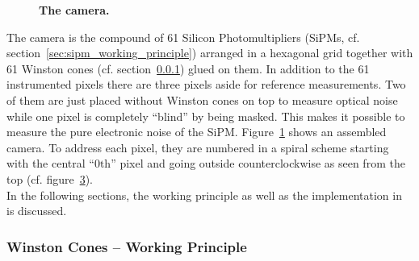\begin{figure}[H]
	\centering
	\begin{subfigure}[t]{0.49\textwidth}
		\label{iceact:camera:picture}	
	\end{subfigure}
	\hfill
	\begin{subfigure}[t]{0.49\textwidth}
		\usebox{\savedimage}
		\label{iceact:camera:pixelnumbering}	
	\end{subfigure}
	\caption[The \iceact camera]{\textbf{The \iceact camera.}}	
\end{figure}

The \iceact camera is the compound of 61 Silicon Photomultipliers (SiPMs, cf. section~\ref{sec:sipm_working_principle}) arranged in a hexagonal grid together with 61 Winston cones (cf. section~\ref{sec:winstoncones}) glued on them. In addition to the 61 instrumented pixels there are three pixels aside for reference measurements. Two of them are just placed without Winston cones on top to measure optical noise while one pixel is completely \enquote{blind} by being masked. This makes it possible to measure the pure electronic noise of the SiPM. Figure~\ref{iceact:camera:picture} shows an assembled \iceact camera. To address each pixel, they are numbered in a spiral scheme starting with the central \enquote{0$\text{th}$} pixel and going outside counterclockwise as seen from the top (cf. figure~\ref{iceact:camera:pixelnumbering}).\\

In the following sections, the working principle as well as the implementation in \geant is discussed.

\subsubsection{Winston Cones -- Working Principle}\label{sec:winstoncones}

